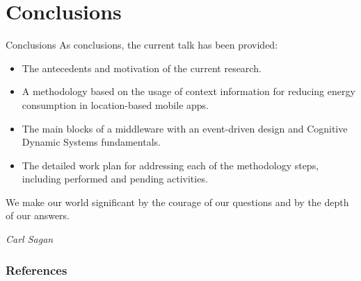\documentclass[10pt,xcolor={dvipsnames}]{beamer}
\begin{document}
\section{Conclusions}
\begin{frame}{Conclusions}{}
As conclusions, the current talk has been provided:
\begin{itemize}
  \item<+-> The antecedents and motivation of the current research.
  \item<+-> A methodology based on the usage of context information for reducing energy consumption in location-based mobile apps.
  \item<+-> The main blocks of a middleware with an event-driven design and Cognitive Dynamic Systems fundamentals.
  \item<+-> The detailed work plan for addressing each of the methodology steps, including performed and pending activities.
\end{itemize}
\end{frame}

{\aauwavesbg
\begin{frame}
  { \tiny
    \epigraph{\tiny We make our world significant by the courage of our questions and by the depth of our answers.}{\tiny \textit{Carl Sagan}}
  }
\end{frame}}

\begin{frame}[allowframebreaks]
        \frametitle{References}
%


\end{frame}
\end{document}
